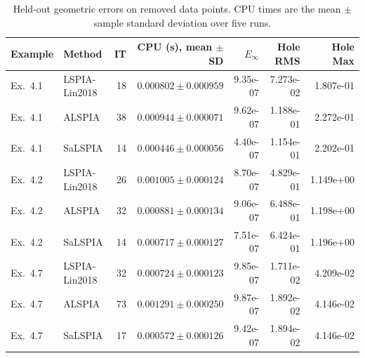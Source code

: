\begin{table}[H]
\centering
\caption{Held-out geometric errors on removed data points. CPU times are the mean $\pm$ sample standard deviation over five runs.}
\label{tab:missing_heldout_error}
\begin{tabular}{llrrrrr}
\hline
Example & Method & IT & CPU (s), mean $\pm$ SD & $E_\infty$ & Hole RMS & Hole Max \\
\hline
Ex.~4.1 & LSPIA-Lin2018 & 18 & $0.000802 \pm 0.000959$ & 9.35e-07 & 7.273e-02 & 1.807e-01 \\
Ex.~4.1 & ALSPIA & 38 & $0.000944 \pm 0.000071$ & 9.62e-07 & 1.188e-01 & 2.272e-01 \\
Ex.~4.1 & SaLSPIA & 14 & $0.000446 \pm 0.000056$ & 4.40e-07 & 1.154e-01 & 2.202e-01 \\
Ex.~4.2 & LSPIA-Lin2018 & 26 & $0.001005 \pm 0.000124$ & 8.70e-07 & 4.829e-01 & 1.149e+00 \\
Ex.~4.2 & ALSPIA & 32 & $0.000881 \pm 0.000134$ & 9.06e-07 & 6.488e-01 & 1.198e+00 \\
Ex.~4.2 & SaLSPIA & 14 & $0.000717 \pm 0.000127$ & 7.51e-07 & 6.424e-01 & 1.196e+00 \\
Ex.~4.7 & LSPIA-Lin2018 & 32 & $0.000724 \pm 0.000123$ & 9.85e-07 & 1.711e-02 & 4.209e-02 \\
Ex.~4.7 & ALSPIA & 73 & $0.001291 \pm 0.000250$ & 9.87e-07 & 1.892e-02 & 4.146e-02 \\
Ex.~4.7 & SaLSPIA & 17 & $0.000572 \pm 0.000126$ & 9.42e-07 & 1.894e-02 & 4.146e-02 \\
\hline
\end{tabular}
\end{table}
